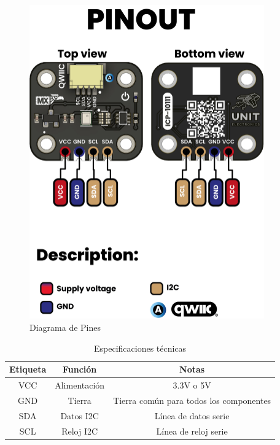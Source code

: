\documentclass[11pt,a4paper]{article}
\begin{document}
\begin{figure}[H]
\centering
\includegraphics[width=0.9\textwidth]{es_unit_pinout_v_0_0_1_ue0094_icp10111_barometric_pressure_sensor_en.jpg}
\caption{Diagrama de Pines}
\label{fig:es-unit-pinout-v-0-0-1-ue0094-icp10111-barometric-pressure-sensor-en-jpg}
\end{figure}




\begin{table}[H]
\centering
\small
\begin{tabular}{|c|c|c|}
\hline
Etiqueta & Función & Notas \\
\hline
VCC & Alimentación & 3.3V o 5V \\
GND & Tierra & Tierra común para todos los componentes \\
SDA & Datos I2C & Línea de datos serie \\
SCL & Reloj I2C & Línea de reloj serie \\
\hline
\end{tabular}
\caption{Especificaciones técnicas}
\end{table}
\end{document}

